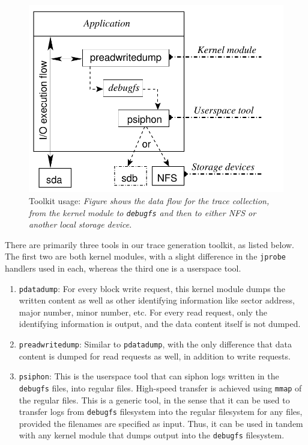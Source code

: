
\begin{figure}[t]
    \centering
    \includegraphics[scale=0.8]{tracingchap-figures/toolkit-usability.pdf}
    \caption{Toolkit usage: \textit{Figure shows the data flow
			for the trace collection, from the kernel module to \texttt{debugfs}
		and then to either NFS or another local storage device.}}
    \label{fig:toolkit-usability}
\end{figure}

There are primarily three tools in our trace generation toolkit, as listed
below. The first two are both kernel modules, with a slight difference 
in the \texttt{jprobe} handlers used in each, whereas the third one is
a userspace tool.
\begin{enumerate}
	\item \texttt{pdatadump}: For every block write request, this kernel
		module dumps the written content as well as other identifying 
		information like sector address, major number, minor number, etc.
		For every read request, only the identifying information is 
		output, and the data content itself is not dumped.
	\item \texttt{preadwritedump}: Similar to \texttt{pdatadump}, with the
		only difference that data content is dumped for read requests as 
		well, in addition to write requests.
	\item \texttt{psiphon}: This is the userspace tool that can siphon 
		logs written in the \texttt{debugfs} files, into regular files.
		High-speed transfer is achieved using \texttt{mmap} of the
		regular files. This is a generic tool, in the sense that it can 
		be used to transfer logs from \texttt{debugfs} filesystem into
		the regular filesystem for any files, provided the filenames 
		are specified as input. Thus, it can be used in tandem with any
		kernel module that dumps output into the \texttt{debugfs} filesystem.
\end{enumerate}

